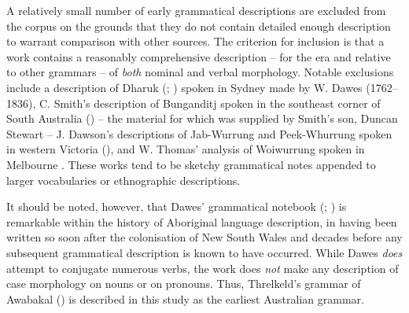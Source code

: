 A relatively small number of early grammatical descriptions are excluded from the corpus on the grounds that they do not contain detailed enough description to warrant comparison with other sources. The criterion for inclusion is that a work contains a reasonably comprehensive description – for the era and relative to other grammars – of \textit{both} nominal and verbal morphology. Notable exclusions include a description of Dharuk (\citeyear{dawes_grammatical_1790}; \citeyear{dawes_vocabulary_1790}) spoken in Sydney made by W. Dawes (1762--1836), C. Smith’s description of Bunganditj spoken in the southeast corner of South Australia (\citeyear{smith_booandik_1880}) – the material for which was supplied by Smith's son, Duncan Stewart – J. Dawson’s descriptions of Jab-Wurrung and Peek-Whurrung spoken in western Victoria (\citeyear{dawson_australian_1881}), and W. Thomas’ analysis of Woiwurrung spoken in Melbourne \citep[118--120]{hagenauer_language_1878}. These works tend to be sketchy grammatical notes appended to larger vocabularies or ethnographic descriptions. 

It should be noted, however, that Dawes’ grammatical notebook (\citeyear{dawes_grammatical_1790}; \citeyear{dawes_vocabulary_1790}) is remarkable within the history of Aboriginal language description, in having been written so soon after the colonisation of New South Wales and decades before any subsequent grammatical description is known to have occurred. While Dawes \textit{does} attempt to conjugate numerous verbs, the work does \textit{not} make any description of case morphology on nouns or on pronouns. Thus, Threlkeld’s grammar of Awabakal (\citeyear{threlkeld_australian_1834}) is described in this study as the earliest Australian grammar. 

